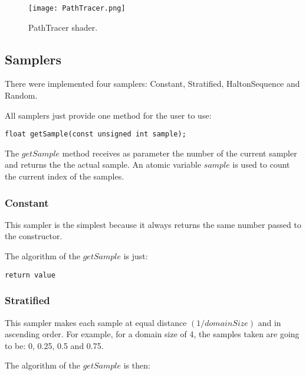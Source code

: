 \begin{figure}[H]
	\centering
	\caption{PathTracer shader.}
	\label{PathTracer shader.}
	\texttt{[image: PathTracer.png]}
\end{figure}


\subsection{Samplers}

\par
There were implemented four samplers: Constant, Stratified, HaltonSequence and Random.

\par
All samplers just provide one method for the user to use:
\begin{lstlisting}
float getSample(const unsigned int sample);
\end{lstlisting}

\par
The
$getSample$
method receives as parameter the number of the current sampler and returns the the actual sample.
An atomic variable
$sample$
is used to count the current index of the samples.

\subsubsection{Constant}

\par
This sampler is the simplest because it always returns the same number passed to the constructor.

\par
The algorithm of the
$getSample$
is just:

\begin{lstlisting}
return value
\end{lstlisting}


\subsubsection{Stratified}

\par
This sampler makes each sample at equal distance
$(1 / domainSize)$
and in ascending order.
For example, for a domain size of 4, the samples taken are going to be: 0, 0.25, 0.5 and 0.75.

\par
The algorithm of the
$getSample$
is then:


